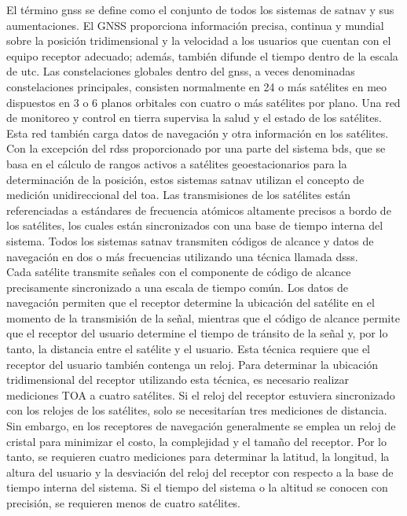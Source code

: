 \begin{justify}
    El término \gls{gnss} se define como el conjunto de todos los sistemas de \gls{satnav} y sus aumentaciones. El GNSS proporciona información precisa, continua y mundial
    sobre la posición tridimensional y la velocidad a los usuarios que cuentan con el equipo receptor adecuado; además, también difunde el tiempo dentro de la escala de \gls{utc}.
    Las constelaciones globales dentro del \gls{gnss}, a veces denominadas constelaciones principales, consisten normalmente en 24 o más satélites en \gls{meo} dispuestos
    en 3 o 6 planos orbitales con cuatro o más satélites por plano. Una red de monitoreo y control en tierra supervisa la salud y el estado de los satélites.
    Esta red también carga datos de navegación y otra información en los satélites.\\

    Con la excepción del \gls{rdss} proporcionado por una parte del sistema \gls{bds}, que se basa en el cálculo de rangos activos a satélites geoestacionarios para la determinación
    de la posición, estos sistemas \gls{satnav} utilizan el concepto de medición unidireccional del \gls{toa}. Las transmisiones de los satélites están referenciadas a estándares
    de frecuencia atómicos altamente precisos a bordo de los satélites, los cuales están sincronizados con una base de tiempo interna del sistema. Todos los sistemas
    \gls{satnav} transmiten códigos de alcance y datos de navegación en dos o más frecuencias utilizando una técnica llamada \gls{dsss}.\\

    Cada satélite transmite señales con el componente de código de alcance precisamente sincronizado a una escala de tiempo común. Los datos de navegación permiten que el
    receptor determine la ubicación del satélite en el momento de la transmisión de la señal, mientras que el código de alcance permite que el receptor del usuario determine
    el tiempo de tránsito de la señal y, por lo tanto, la distancia entre el satélite y el usuario. Esta técnica requiere que el receptor del usuario también contenga un reloj.
    Para determinar la ubicación tridimensional del receptor utilizando esta técnica, es necesario realizar mediciones TOA a cuatro satélites. Si el reloj del receptor
    estuviera sincronizado con los relojes de los satélites, solo se necesitarían tres mediciones de distancia. Sin embargo, en los receptores de navegación generalmente
    se emplea un reloj de cristal para minimizar el costo, la complejidad y el tamaño del receptor. Por lo tanto, se requieren cuatro mediciones para determinar la latitud,
    la longitud, la altura del usuario y la desviación del reloj del receptor con respecto a la base de tiempo interna del sistema. Si el tiempo del sistema o la altitud se
    conocen con precisión, se requieren menos de cuatro satélites.
\end{justify}

